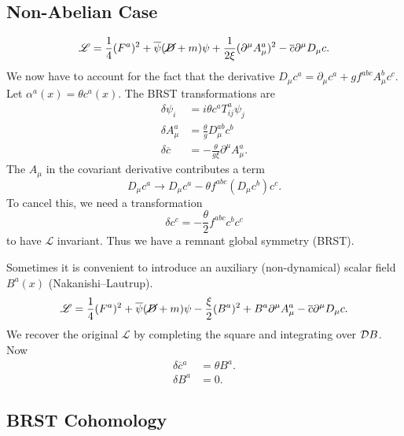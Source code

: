 \subsection{Non-Abelian Case}%
\label{sub:non_abelian_case}

\begin{equation}
  \mathscr{L} = \frac{1}{4} (F^{a})^2 + \overline{\psi}{}(\cancel{D} + m) \psi + \frac{1}{2 \xi} (\partial^{\mu} A_{\mu}^{a})^2 - \overline{c}{} \partial^{\mu} D_{\mu} c.
\end{equation}
We now have to account for the fact that the derivative $D_{\mu} c^{a} = \partial_{\mu} c^{a} + g f^{abc} A_{\mu}^{b} c^{c}$.
Let $\alpha^{a}(x) = \theta c^{a}(x)$. The BRST transformations are
\begin{align}
  \delta \psi_i &= i \theta c^a T^{a}_{ij} \psi_{j} \\
  \delta A_{\mu}^{a} &= \frac{\theta}{g} D_{\mu}^{ab} c^{b} \\
  \delta \overline{c}{} &= -\frac{\theta}{g \xi} \partial^{\mu} A^{a}_{\mu}.
\end{align}
The $A_{\mu}$ in the covariant derivative contributes a term
\begin{equation}
  D_{\mu} c^{a} \to D_{\mu} c^{a} - \theta f^{abc} (D_{\mu} c^{b}) c^{c}.
\end{equation}
To cancel this, we need a transformation
\begin{equation}
  \delta c^{c} = -\frac{\theta}{2} f^{abc} c^{b} c^{c}
\end{equation}
to have $\mathscr{L}$ invariant.
Thus we have a remnant global symmetry (BRST).

Sometimes it is convenient to introduce an auxiliary (non-dynamical) scalar field $B^{a}(x)$ (Nakanishi--Lautrup).
\begin{equation}
  \mathscr{L} = \frac{1}{4} (F^{a})^2 + \overline{\psi}{} (\cancel{D} + m) \psi - \frac{\xi}{2} (B^{a})^2 + B^{a} \partial^{\mu} A^{a}_{\mu} - \overline{c}{} \partial^{\mu} D_{\mu} c.
\end{equation}
We recover the original $\mathscr{L}$ by completing the square and integrating over $\mathop{\mathcal{D} B}$.
Now
\begin{align}
  \delta \overline{c}{}^{a} &= \theta B^{a}. \\
  \delta B^{a} &= 0.
\end{align}

\subsection{BRST Cohomology}%
\label{sub:brst_cohomology}

